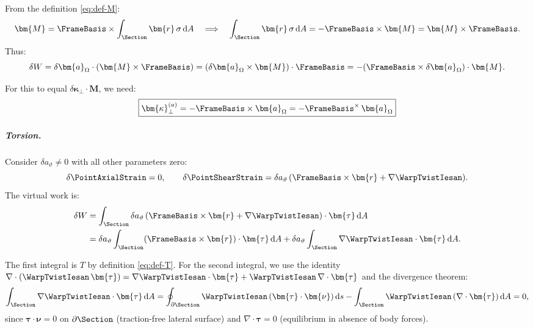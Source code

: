 From the definition \eqref{eq:def-M}:
\begin{equation*}
\bm{M} = \FrameBasis \times \int_\Section \bm{r}\,\sigma \, \mathrm{d}A 
\quad\Longrightarrow\quad 
\int_\Section \bm{r}\,\sigma \, \mathrm{d}A = -\FrameBasis \times \bm{M} = \bm{M} \times \FrameBasis.
\end{equation*}
Thus:
\begin{equation*}
\delta W = \delta\bm{a}_\Omega \cdot (\bm{M} \times \FrameBasis) 
= (\delta\bm{a}_\Omega \times \bm{M}) \cdot \FrameBasis 
= -(\FrameBasis \times \delta\bm{a}_\Omega) \cdot \bm{M}.
\end{equation*}

For this to equal $\delta\bm{\kappa}_\perp \cdot \bm{M}$, we need:
\begin{equation*}
\boxed{\bm{\kappa}_\perp^{(a)} = -\FrameBasis \times \bm{a}_\Omega = -\FrameBasis^\times\,\bm{a}_\Omega}
\end{equation*}

\subparagraph{Torsion.}

Consider $\delta a_\vartheta \neq 0$ with all other parameters zero:
\begin{equation*}
\delta\PointAxialStrain = 0, \qquad 
\delta\PointShearStrain = \delta a_\vartheta\,(\FrameBasis \times \bm{r} + \nabla\WarpTwistIesan).
\end{equation*}
The virtual work is:
\begin{align*}
\delta W &= \int_\Section \delta a_\vartheta\,(\FrameBasis \times \bm{r} + \nabla\WarpTwistIesan) \cdot \bm{\tau} \, \mathrm{d}A \\
&= \delta a_\vartheta \int_\Section (\FrameBasis \times \bm{r}) \cdot \bm{\tau} \, \mathrm{d}A 
+ \delta a_\vartheta \int_\Section \nabla\WarpTwistIesan \cdot \bm{\tau} \, \mathrm{d}A.
\end{align*}

The first integral is $T$ by definition \eqref{eq:def-T}. For the second integral, 
we use the identity $\nabla \cdot (\WarpTwistIesan\,\bm{\tau}) = \nabla\WarpTwistIesan \cdot \bm{\tau} + \WarpTwistIesan\,\nabla \cdot \bm{\tau}$ 
and the divergence theorem:
\begin{equation*}
\int_\Section \nabla\WarpTwistIesan \cdot \bm{\tau} \, \mathrm{d}A 
= \oint_{\partial\Section} \WarpTwistIesan\,(\bm{\tau} \cdot \bm{\nu}) \, \mathrm{d}s 
- \int_\Section \WarpTwistIesan\,(\nabla \cdot \bm{\tau}) \, \mathrm{d}A = 0,
\end{equation*}
since $\bm{\tau} \cdot \bm{\nu} = 0$ on $\partial\Section$ (traction-free lateral surface) 
and $\nabla \cdot \bm{\tau} = 0$ (equilibrium in absence of body forces).

